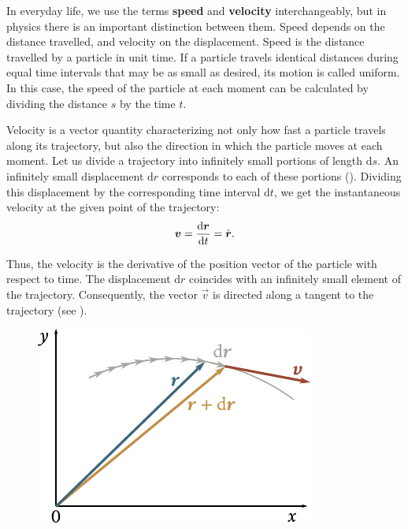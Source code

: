 In everyday life, we use the terms \textbf{speed} and \textbf{velocity} interchangeably, but in physics there is an important distinction between them. Speed depends on the distance travelled, and velocity on the displacement. Speed is the distance travelled by a particle in unit time. If a particle travels identical distances during equal time intervals that may be as small as desired, its motion is called uniform. In this case, the speed of the particle at each moment can be calculated by dividing the distance $s$ by the time $t$.

Velocity is a vector quantity characterizing not only how fast a particle travels along its trajectory, but also the direction in which the particle moves at each moment. Let us divide a trajectory into infinitely small portions of length $\mathrm{d}s$. An infinitely small displacement $\mathrm{d}r$ corresponds to each of these portions (). Dividing this displacement by the corresponding time interval $\mathrm{d}t$, we get the instantaneous velocity at the given point of the trajectory:
\begin{equation}\label{eq:1_57}
\boldsymbol{v} = \frac{\mathrm{d}\boldsymbol{r}}{\mathrm{d} t} = \dot{\boldsymbol{r}}.
\end{equation}

\noindent
Thus, the velocity is the derivative of the position vector of the particle with respect to time. The displacement $\mathrm{d}r$ coincides with an infinitely small element of the trajectory. Consequently, the vector $\vec{v}$ is directed along a tangent to the trajectory (see ).

\begin{figure}[t]
	\begin{center}
		\includegraphics[scale=0.9]{figures/ch_01/fig_1_22.pdf}
		\caption[]{}
		\label{fig:1_22}
	\end{center}
\vspace{-0.7cm}
\end{figure}


